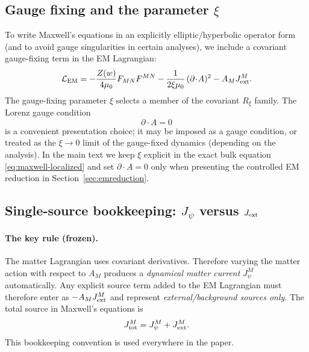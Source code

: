 \documentclass[11pt]{article}
\begin{document}
\subsection{Gauge fixing and the parameter \texorpdfstring{$\xi$}{xi}}
\label{app:gauge-fixing}

To write Maxwell's equations in an explicitly elliptic/hyperbolic operator form (and to avoid gauge singularities in certain analyses), we include a covariant gauge-fixing term in the EM Lagrangian:
\begin{equation}
\mathcal L_{\rm EM}
=
-\frac{Z(w)}{4\mu_0}F_{MN}F^{MN}
-\frac{1}{2\xi\mu_0}\,(\partial\!\cdot\!A)^2
- A_M J_{\rm ext}^M.
\end{equation}
The gauge-fixing parameter $\xi$ selects a member of the covariant $R_\xi$ family. The Lorenz gauge condition
\begin{equation}
\partial\!\cdot\!A = 0
\label{eq:lorenz-gauge-app}
\end{equation}
is a convenient presentation choice; it may be imposed as a gauge condition, or treated as the $\xi\to 0$ limit of the gauge-fixed dynamics (depending on the analysis). In the main text we keep $\xi$ explicit in the exact bulk equation \eqref{eq:maxwell-localized} and set $\partial\!\cdot\!A=0$ only when presenting the controlled EM reduction in Section~\ref{sec:emreduction}.

\subsection{Single-source bookkeeping: \texorpdfstring{$J_\psi$}{Jpsi} versus \texorpdfstring{$J_{\rm ext}$}{Jext}}
\label{app:source-bookkeeping}

\paragraph{The key rule (frozen).}
The matter Lagrangian uses covariant derivatives. Therefore varying the matter action with respect to $A_M$ produces a \emph{dynamical matter current} $J_\psi^M$ automatically. Any explicit source term added to the EM Lagrangian must therefore enter as $-A_M J_{\rm ext}^M$ and represent \emph{external/background sources only}. The total source in Maxwell's equations is
\begin{equation}
J_{\rm tot}^M = J_\psi^M + J_{\rm ext}^M.
\end{equation}
This bookkeeping convention is used everywhere in the paper.
\end{document}

